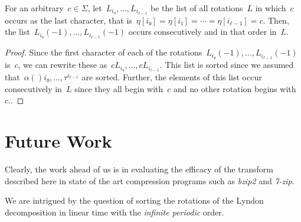\documentclass[a4paper,12pt]{article}
\numberwithin{algorithm}{section}
\begin{document}
\begin{Lemma}[match:m]
For an arbitrary~$c ∈ Σ$, let~$L_{i₀},…, L_{i_{ℓ-1}}$ be the list of
  all rotations~$L$ in  which~$c$ occurs as the last character, that is~$η[i₀]=η[i₁]=⋯=η[i_{ℓ-1}]=c$.
Then, the list~$L_{i₀}(-1),…, L_{i_{ℓ-1}}(-1)$ occurs consecutively and in that order in~$L$.
\end{Lemma}

\begin{proof}
Since the first character of each of the rotations~$L_{i₀}(-1),…, L_{i_{ℓ-1}}(-1)$ is~$c$,
  we can rewrite these
  as~$c L_{i₀},…, cL_{i_{ℓ-1}}$.
This list is sorted since we assumed
 that~$α(){i₀},…, τ^{i_{ℓ-1}}$ are sorted.
Further, the elements of this list occur consecutively in~$L$ since they all begin with~$c$ and no other rotation
  begins with~$c$..
\end{proof}

\section{Future Work}
\label{Section:Final}
Clearly, the work ahead of us is in evaluating the efficacy of the transform described here in
state of the art compression programs such as \emph{bzip2} and \emph{7-zip}.

We are intrigued by the question of sorting the rotations of the Lyndon decomposition
  in linear time with the \emph{infinite periodic} order.



\end{document}
